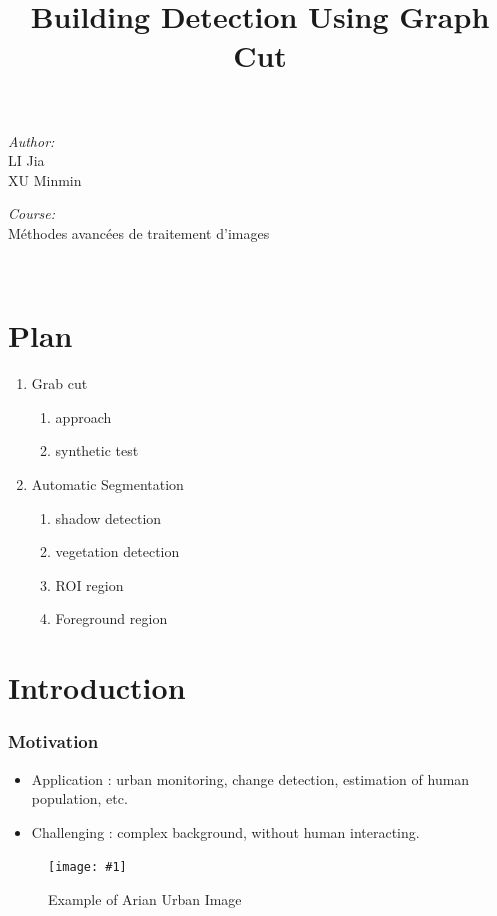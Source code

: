 \documentclass[compress]{beamer} %
\newcommand{\insertF}[3]{
  \begin{figure}[h!]
    \centering
    \begin{minipage}{#3\linewidth}
    \texttt{[image: \#1]}
    \end{minipage}  
      \caption{#2}
  \end{figure}  
}
\begin{document}
 \title{Building Detection Using Graph Cut}  

 \begin{frame}
\titlepage
    \centering
    \begin{minipage}{0.4\textwidth}
    \begin{flushleft} \large
    \emph{Author:}\\
    LI Jia\\
    XU Minmin\\
    
    \end{flushleft}
    \end{minipage}
    \begin{minipage}{0.4\textwidth}
    \begin{flushright} \large
    \emph{Course:}\\
    Méthodes avancées de traitement d'images 
    \end{flushright}
    \end{minipage}\\[3cm]
 \end{frame}

 \section{Plan}
 \begin{frame}
  \scriptsize
  {
  \begin{enumerate}
  \item Grab cut 
    \begin{enumerate}
     \item approach
     \item synthetic test
    \end{enumerate}
  \item Automatic Segmentation
    \begin{enumerate}
     \item shadow detection
     \item vegetation detection
     \item ROI region
     \item Foreground region
    \end{enumerate}
  \end{enumerate}
  }
 \end{frame} 
 
 \section{Introduction}
 \begin{frame}
  \frametitle{Motivation}
  \begin{itemize}
   \item Application : urban monitoring, change detection, estimation of human population, etc.
   \item Challenging : complex background, without human interacting.
  \end{itemize}
  \insertF{vatican-city-satellite-image-ikonos-high-resolution}{Example of Arian Urban Image}{0.4}
 \end{frame}
\end{document}

